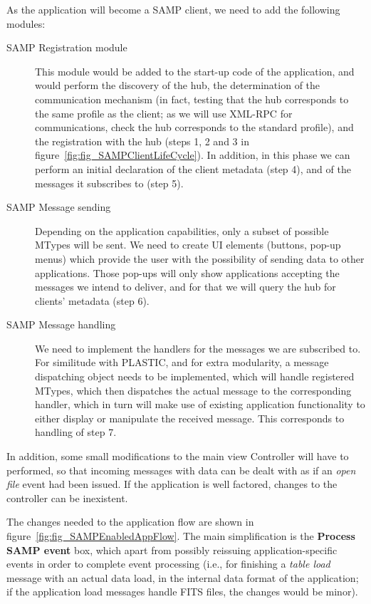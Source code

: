 		As the application will become a SAMP client, we need
		to add the following modules:
		
		\begin{description}
			\item[SAMP Registration module] This module would be
			added to the start-up code of the application, and
			would perform the discovery of the hub, the
			determination of the communication mechanism (in fact,
			testing that the hub corresponds to the same profile
			as the client; as we will use XML-RPC for
			communications, check the hub corresponds to the
			standard profile), and
			the registration with the hub 
			(steps 1, 2 and
			3 in figure~\ref{fig:fig_SAMPClientLifeCycle}).
			In addition, in this phase we can perform an initial
			declaration of the client metadata (step 4), and of
			the messages it subscribes to (step 5).
			
			\item[SAMP Message sending] Depending on the
			application capabilities, only a subset of possible
			MTypes will be sent. We need to create UI elements
			(buttons, pop-up menus) which provide the user with
			the possibility of sending data to other applications.
			Those pop-ups will only show applications accepting
			the messages we intend to deliver, and for that we
			will query the hub for clients' metadata (step 6).
			
			\item[SAMP Message handling] We need to implement
			the handlers for the messages we are subscribed to.
			For similitude with PLASTIC, and for extra modularity,
			a message dispatching object needs to be implemented,
			which will handle registered MTypes, which then
			dispatches the actual message to the corresponding
			handler, which in turn will make use of existing 
			application functionality to either display or
			manipulate the received message. This corresponds to
			handling of step 7.
		\end{description}
		
		In addition, some small modifications to the main view
		Controller will have to performed, so that incoming
		messages with data can be dealt with as if an \emph{open
		file} event had been issued. If the application is
		well factored, changes to the controller can be inexistent.
		
		The changes needed to the application flow are shown in 
		figure~\ref{fig:fig_SAMPEnabledAppFlow}. The main
		simplification is the \textbf{Process SAMP event} box,
		which apart from possibly reissuing application-specific
		events in order to complete event processing (i.e., for
		finishing a \emph{table load} message with an actual
		data load, in the internal data format of the application;
		if the application load messages handle FITS files, the
		changes would be minor).
		
